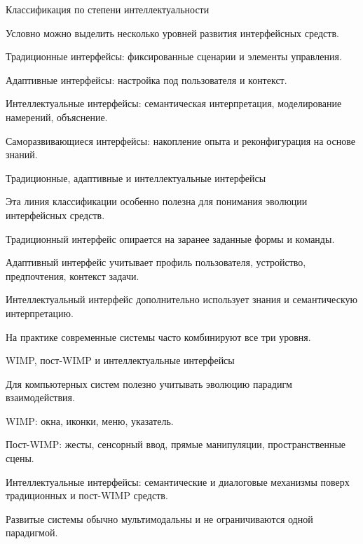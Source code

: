 \begin{frame}{Классификация по степени интеллектуальности}
	\topline
	\justifying

	Условно можно выделить несколько уровней развития интерфейсных средств.
	
	\begin{textitemize}
		\item Традиционные интерфейсы: фиксированные сценарии и элементы управления.
		\item Адаптивные интерфейсы: настройка под пользователя и контекст.
		\item Интеллектуальные интерфейсы: семантическая интерпретация, моделирование намерений, объяснение.
		\item Саморазвивающиеся интерфейсы: накопление опыта и реконфигурация на основе знаний.
	\end{textitemize}
\end{frame}

\begin{frame}{Традиционные, адаптивные и интеллектуальные интерфейсы}
	\topline
	\justifying

	Эта линия классификации особенно полезна для понимания эволюции интерфейсных средств.
	
	\begin{textitemize}
		\item Традиционный интерфейс опирается на заранее заданные формы и команды.
		\item Адаптивный интерфейс учитывает профиль пользователя, устройство, предпочтения, контекст задачи.
		\item Интеллектуальный интерфейс дополнительно использует знания и семантическую интерпретацию.
		\item На практике современные системы часто комбинируют все три уровня.
	\end{textitemize}
\end{frame}

\begin{frame}{WIMP, пост-WIMP и интеллектуальные интерфейсы}
	\topline
	\justifying

	Для компьютерных систем полезно учитывать эволюцию парадигм взаимодействия.
	
	\begin{textitemize}
		\item WIMP: окна, иконки, меню, указатель.
		\item Пост-WIMP: жесты, сенсорный ввод, прямые манипуляции, пространственные сцены.
		\item Интеллектуальные интерфейсы: семантические и диалоговые механизмы поверх традиционных и пост-WIMP средств.
		\item Развитые системы обычно мультимодальны и не ограничиваются одной парадигмой.
	\end{textitemize}
\end{frame}


